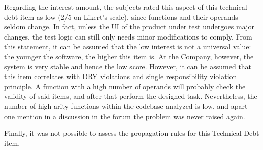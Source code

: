      \label{sec:disc-rq3-high-arity}
    Regarding the interest amount, the subjects rated this aspect of this technical debt item as low (2/5 on Likert's scale), since functions and their operands seldom change. In fact, unless the UI of the product under test undergoes major changes, the test logic can still only needs minor modifications to comply. From this statement, it can be assumed that the low interest is not a universal value: the younger the software, the higher this item is. At the Company, however, the system is very stable and hence the low score. However, it can be assumed that this item correlates with DRY violations and single responsibility violation principle. A function with a high number of operands will probably check the validity of said items, and after that perform the designed task. Nevertheless, the number of high arity functions within the codebase analyzed is low, and apart one mention in a discussion in the forum the problem was never raised again.

    Finally, it was not possible to assess the propagation rules for this Technical Debt item.




